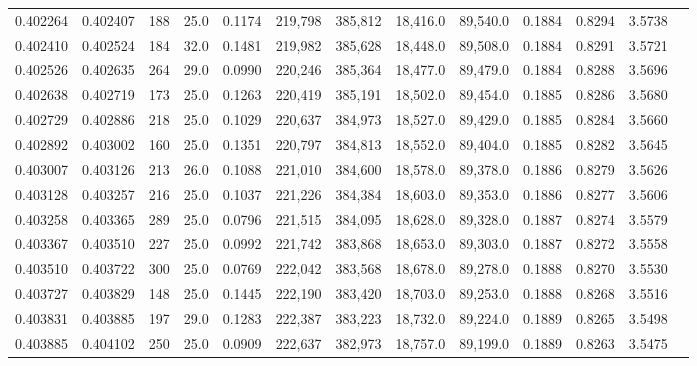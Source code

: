 \begin{tabular}{rrrrrrrrrrrrr}
0.402264 & 0.402407 &   188 & 25.0 &                                     0.1174 & 219,798 & 385,812 &  18,416.0 &  89,540.0 & 0.1884 & 0.8294 & 3.5738 \\
0.402410 & 0.402524 &   184 & 32.0 &                                     0.1481 & 219,982 & 385,628 &  18,448.0 &  89,508.0 & 0.1884 & 0.8291 & 3.5721 \\
0.402526 & 0.402635 &   264 & 29.0 &                                     0.0990 & 220,246 & 385,364 &  18,477.0 &  89,479.0 & 0.1884 & 0.8288 & 3.5696 \\
0.402638 & 0.402719 &   173 & 25.0 &                                     0.1263 & 220,419 & 385,191 &  18,502.0 &  89,454.0 & 0.1885 & 0.8286 & 3.5680 \\
0.402729 & 0.402886 &   218 & 25.0 &                                     0.1029 & 220,637 & 384,973 &  18,527.0 &  89,429.0 & 0.1885 & 0.8284 & 3.5660 \\
0.402892 & 0.403002 &   160 & 25.0 &                                     0.1351 & 220,797 & 384,813 &  18,552.0 &  89,404.0 & 0.1885 & 0.8282 & 3.5645 \\
0.403007 & 0.403126 &   213 & 26.0 &                                     0.1088 & 221,010 & 384,600 &  18,578.0 &  89,378.0 & 0.1886 & 0.8279 & 3.5626 \\
0.403128 & 0.403257 &   216 & 25.0 &                                     0.1037 & 221,226 & 384,384 &  18,603.0 &  89,353.0 & 0.1886 & 0.8277 & 3.5606 \\
0.403258 & 0.403365 &   289 & 25.0 &                                     0.0796 & 221,515 & 384,095 &  18,628.0 &  89,328.0 & 0.1887 & 0.8274 & 3.5579 \\
0.403367 & 0.403510 &   227 & 25.0 &                                     0.0992 & 221,742 & 383,868 &  18,653.0 &  89,303.0 & 0.1887 & 0.8272 & 3.5558 \\
0.403510 & 0.403722 &   300 & 25.0 &                                     0.0769 & 222,042 & 383,568 &  18,678.0 &  89,278.0 & 0.1888 & 0.8270 & 3.5530 \\
0.403727 & 0.403829 &   148 & 25.0 &                                     0.1445 & 222,190 & 383,420 &  18,703.0 &  89,253.0 & 0.1888 & 0.8268 & 3.5516 \\
0.403831 & 0.403885 &   197 & 29.0 &                                     0.1283 & 222,387 & 383,223 &  18,732.0 &  89,224.0 & 0.1889 & 0.8265 & 3.5498 \\
0.403885 & 0.404102 &   250 & 25.0 &                                     0.0909 & 222,637 & 382,973 &  18,757.0 &  89,199.0 & 0.1889 & 0.8263 & 3.5475 \\

\end{tabular}
